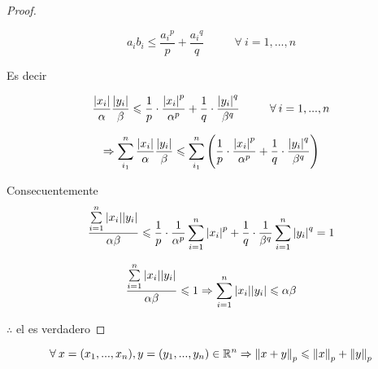 \begin{proof}
\begin{enumerate}
        \begin{equation*}
        {a}_{i}{b}_{i} \leqslant \frac{{{a}_{i}}^{p}}{p} + \frac{{{a}_{i}}^{q}}{q} \: \: \: \: \: \: \: \: \: \: \: \: \forall \: i = 1,...,n
        \end{equation*}

        Es decir

        \begin{equation*}
           \frac{\abs{x_i}}{\alpha} \frac{\abs{y_i}}{\beta} \leqslant \frac{1}{p} \cdot\frac{{\abs{x_i}}^{p}}{\alpha^p} +  \frac{1}{q} \cdot\frac{{\abs{y_i}}^{q}}{\beta^q} \: \: \: \: \: \: \: \: \: \: \: \: \forall \: i = 1,...,n
        \end{equation*}
        
        \begin{equation*}
            \Rightarrow \sum_{i_1}^{n}\frac{\abs{x_i}}{\alpha} \frac{\abs{y_i}}{\beta} \leqslant \sum_{i_1}^{n} \left( \frac{1}{p} \cdot\frac{{\abs{x_i}}^{p}}{\alpha^p} +  \frac{1}{q} \cdot\frac{{\abs{y_i}}^{q}}{\beta^q} \right)
        \end{equation*}

        Consecuentemente
        \begin{equation*}
            \frac{ \sum\limits_{i=1}^{n} \abs{{x}_{i}} \abs{{y}_{i}}}{\alpha \beta} \leqslant \frac{1}{p} \cdot \frac{1}{\alpha^p} \sum\limits_{i=1}^{n} {\abs{{x}_{i}}}^{p} + \frac{1}{q} \cdot \frac{1}{\beta^q} \sum\limits_{i=1}^{n} {\abs{{y}_{i}}}^{q} = 1
        \end{equation*}
        
        \begin{equation*}
            \frac{ \sum\limits_{i=1}^{n} \abs{{x}_{i}} \abs{{y}_{i}}}{\alpha \beta} \leqslant 1 \Rightarrow \sum\limits_{i=1}^{n} \abs{{x}_{i}} \abs{{y}_{i}} \leqslant \alpha \beta
        \end{equation*}
    \end{enumerate}

    $\therefore$ el  es verdadero
\end{proof}

\begin{lemma}
    \begin{equation*}
        \forall \: x = (x_1,...,x_n), y = (y_1,...,y_n) \in \mathbb{R}^n \Rightarrow {\norm{x+y}}_{p} \leqslant {\norm{x}}_{p} + {\norm{y}}_{p}
    \end{equation*}
\end{lemma}

